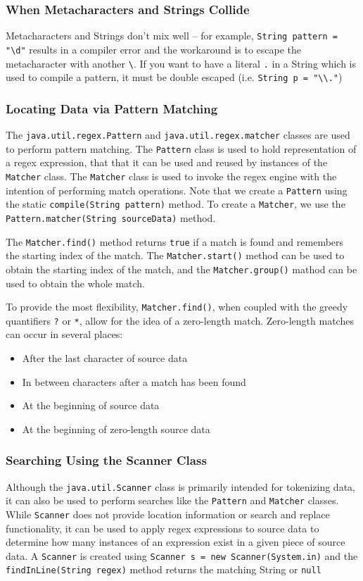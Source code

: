 \subsubsection{When Metacharacters and Strings Collide}
Metacharacters and Strings don't mix well -- for example,
\verb#String pattern = "\d"# results in a compiler error and the workaround is 
to escape the metacharacter with another \verb#\#. If you want to have a 
literal \verb#.# in a String which is used to compile a pattern, it must be 
double escaped (i.e. \verb#String p = "\\."#)

\subsubsection{Locating Data via Pattern Matching}
The \verb#java.util.regex.Pattern# and \verb#java.util.regex.matcher# classes 
are used to perform pattern matching. The \verb#Pattern# class is used to hold 
representation of a regex expression, that that it can be used and reused by 
instances of the \verb#Matcher# class. The \verb#Matcher# class is used to 
invoke the regex engine with the intention of performing match operations. Note 
that we create a \verb#Pattern# using the static \verb#compile(String pattern)# 
method. To create a \verb#Matcher#, we use the
\verb#Pattern.matcher(String sourceData)# method.

The \verb#Matcher.find()# method returns \verb#true# if a match is found and 
remembers the starting index of the match. The \verb#Matcher.start()# method 
can be used to obtain the starting index of the match, and the 
\verb#Matcher.group()# mathod can be used to obtain the whole match.

To provide the most flexibility, \verb#Matcher.find()#, when coupled with the 
greedy quantifiers \verb#?# or \verb#*#, allow for the idea of a zero-length 
match. Zero-length matches can occur in several places:
\begin{itemize}
    \item After the last character of source data
    \item In between characters after a match has been found
    \item At the beginning of source data
    \item At the beginning of zero-length source data
\end{itemize}

\subsubsection{Searching Using the Scanner Class}
Although the \verb#java.util.Scanner# class is primarily intended for 
tokenizing data, it can also be used to perform searches like the 
\verb#Pattern# and \verb#Matcher# classes. While \verb#Scanner# does not 
provide location information or search and replace functionality, it can be 
used to apply regex expressions to source data to determine how many instances 
of an expression exist in a given piece of source data. A \verb#Scanner# is 
created using \verb#Scanner s = new Scanner(System.in)# and the 
\verb#findInLine(String regex)# method returns the matching String or 
\verb#null#

